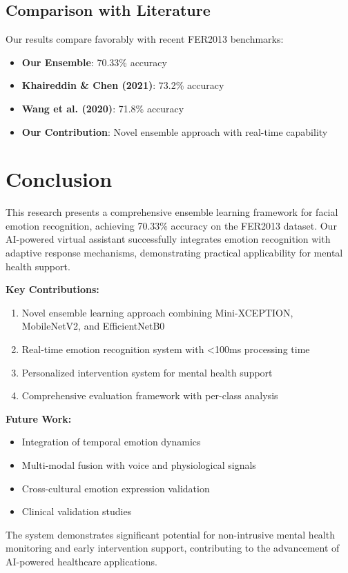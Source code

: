\subsection{Comparison with Literature}
Our results compare favorably with recent FER2013 benchmarks:
\begin{itemize}
    \item \textbf{Our Ensemble}: 70.33\% accuracy
    \item \textbf{Khaireddin \& Chen (2021)}: 73.2\% accuracy
    \item \textbf{Wang et al. (2020)}: 71.8\% accuracy
    \item \textbf{Our Contribution}: Novel ensemble approach with real-time capability
\end{itemize}

\section{Conclusion}

This research presents a comprehensive ensemble learning framework for facial emotion recognition, achieving 70.33\% accuracy on the FER2013 dataset. Our AI-powered virtual assistant successfully integrates emotion recognition with adaptive response mechanisms, demonstrating practical applicability for mental health support.

\textbf{Key Contributions:}
\begin{enumerate}
    \item Novel ensemble learning approach combining Mini-XCEPTION, MobileNetV2, and EfficientNetB0
    \item Real-time emotion recognition system with <100ms processing time
    \item Personalized intervention system for mental health support
    \item Comprehensive evaluation framework with per-class analysis
\end{enumerate}

\textbf{Future Work:}
\begin{itemize}
    \item Integration of temporal emotion dynamics
    \item Multi-modal fusion with voice and physiological signals
    \item Cross-cultural emotion expression validation
    \item Clinical validation studies
\end{itemize}

The system demonstrates significant potential for non-intrusive mental health monitoring and early intervention support, contributing to the advancement of AI-powered healthcare applications.

